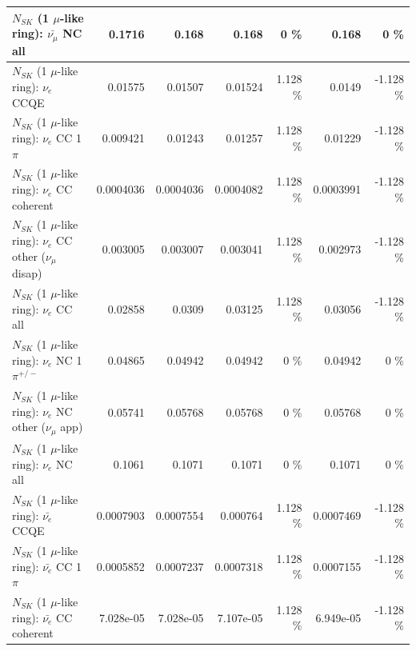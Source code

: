 \begin{table}
\begin{tabular}{| l | r | r | r  r | r  r |}
                          $N_{SK}$ (1 $\mu$-like ring): $\bar{\nu_{\mu}}$ NC all &          0.1716 &           0.168 &           0.168 &        0 \%  &           0.168 &        0 \%  \\ 
\hline
\hline
\hline
                                      $N_{SK}$ (1 $\mu$-like ring): $\nu_e$ CCQE &         0.01575 &         0.01507 &         0.01524 &    1.128 \%  &          0.0149 &   -1.128 \%  \\ 
                                 $N_{SK}$ (1 $\mu$-like ring): $\nu_e$ CC 1$\pi$ &        0.009421 &         0.01243 &         0.01257 &    1.128 \%  &         0.01229 &   -1.128 \%  \\ 
                               $N_{SK}$ (1 $\mu$-like ring): $\nu_e$ CC coherent &       0.0004036 &       0.0004036 &       0.0004082 &    1.128 \%  &       0.0003991 &   -1.128 \%  \\ 
                $N_{SK}$ (1 $\mu$-like ring): $\nu_e$ CC other ($\nu_\mu$ disap) &        0.003005 &        0.003007 &        0.003041 &    1.128 \%  &        0.002973 &   -1.128 \%  \\ 
                                  $N_{SK}$ (1 $\mu$-like ring): $\nu_{e}$ CC all &         0.02858 &          0.0309 &         0.03125 &    1.128 \%  &         0.03056 &   -1.128 \%  \\ 
\hline
                           $N_{SK}$ (1 $\mu$-like ring): $\nu_e$ NC 1$\pi^{+/-}$ &         0.04865 &         0.04942 &         0.04942 &        0 \%  &         0.04942 &        0 \%  \\ 
                  $N_{SK}$ (1 $\mu$-like ring): $\nu_e$ NC other ($\nu_\mu$ app) &         0.05741 &         0.05768 &         0.05768 &        0 \%  &         0.05768 &        0 \%  \\ 
                                  $N_{SK}$ (1 $\mu$-like ring): $\nu_{e}$ NC all &          0.1061 &          0.1071 &          0.1071 &        0 \%  &          0.1071 &        0 \%  \\ 
\hline
\hline
\hline
                                $N_{SK}$ (1 $\mu$-like ring): $\bar{\nu_e}$ CCQE &       0.0007903 &       0.0007554 &        0.000764 &    1.128 \%  &       0.0007469 &   -1.128 \%  \\ 
                           $N_{SK}$ (1 $\mu$-like ring): $\bar{\nu_e}$ CC 1$\pi$ &       0.0005852 &       0.0007237 &       0.0007318 &    1.128 \%  &       0.0007155 &   -1.128 \%  \\ 
                         $N_{SK}$ (1 $\mu$-like ring): $\bar{\nu_e}$ CC coherent &       7.028e-05 &       7.028e-05 &       7.107e-05 &    1.128 \%  &       6.949e-05 &   -1.128 \%  \\ 

\end{tabular}
\end{table}
